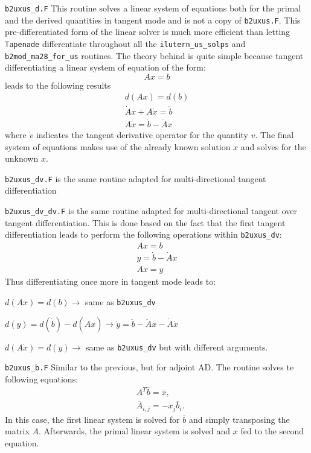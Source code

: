 \begin{description}
  \item{\tt b2uxus\_d.F} This routine solves a linear system of equations both for the primal and the derived quantities in tangent mode and is not a copy of {\tt b2uxus.F}. This pre-differentiated form of the linear solver is much more efficient than letting {\tt Tapenade} differentiate throughout all the {\tt ilutern\_us\_solps} and {\tt b2mod\_ma28\_for\_us} routines. The theory behind is quite simple because tangent differentiating a linear system of equation of the form:
    \begin{equation*}
	Ax=b
    \end{equation*}
  leads to the following results
    \begin{eqnarray*}
      d(Ax)=d(b)\\
      \dot{A}x+A\dot{x}=\dot{b}\\
      A\dot{x}=\dot{b}-\dot{A}x
    \end{eqnarray*}
  where $\dot{v}$ indicates the tangent derivative operator for the quantity $v$. The final system of equations makes use of the already known solution $x$ and solves for the unknown $\dot{x}$. 

  \item{\tt b2uxus\_dv.F} is the same routine adapted for multi-directional tangent differentiation

  \item{\tt b2uxus\_dv\_dv.F} is the same routine adapted for multi-directional tangent over tangent differentiation. This is done based on the fact that the first tangent differentiation leads to perform the following operations within {\tt b2uxus\_dv}:
  \begin{eqnarray*}
  	Ax=b\\
  	y=\dot{b}-\dot{A}x\\
  	A\dot{x}=y
  \end{eqnarray*}
  Thus differentiating once more in tangent mode leads to:

  $d(Ax)=d(b) \rightarrow $ same as {\tt b2uxus\_dv}

  $d(y)=d(\dot{b})-d(\dot{A}x) \rightarrow \dot{y} = \ddot{b} - \ddot{A}x - \dot{A}\dot{x}$

  $d(A\dot{x})=d(y) \rightarrow $ same as {\tt b2uxus\_dv} but with different arguments.

  \item{\tt b2uxus\_b.F} Similar to the previous, but for adjoint AD. The routine solves te following equations:
    \begin{align*}
       &A^T \overline{b} =  \overline{x},\\
       &\overline{A}_{i,j} = -x_j\overline{b}_i.
    \end{align*}
    In this case, the first linear system is solved for $\overline{b}$ and simply transposing the matrix $A$. Afterwards, the primal linear system is solved and $x$ fed to the second equation.


\end{description}
